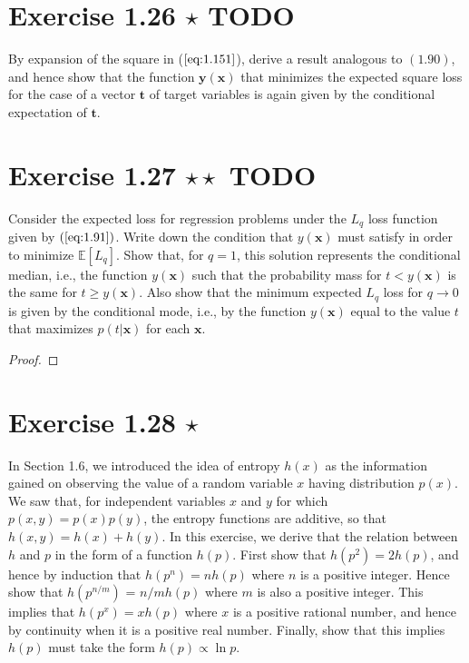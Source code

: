\section*{Exercise 1.26 $\star$ TODO}
By expansion of the square in ($\ref{eq:1.151}$), derive a result analogous to
$(1.90)$, and hence show that the function $\mathbf{y}(\mathbf{x})$ that
minimizes the expected square loss for the case of a vector $\mathbf{t}$ 
of target variables is again given by the conditional expectation of $\mathbf{t}$.

\section*{Exercise 1.27 $\star \star$ TODO}
Consider the expected loss for regression problems under the $L_q$ loss
function given by $(\ref{eq:1.91})$. Write down the condition that $y(\mathbf{x})$ 
must satisfy in order to minimize $\mathbb{E}[L_q]$. Show that, for $q = 1$,
this solution represents the conditional median, i.e., the function 
$y(\mathbf{x})$ such that the probability mass for $t < y(\mathbf{x})$ 
is the same for $t \geq y(\mathbf{x})$. Also show that the minimum expected
$L_q$ loss for $q \to 0$ is given by the conditional mode, i.e., by
the function $y(\mathbf{x})$ equal to the value $t$ that maximizes 
$p(t | \mathbf{x})$ for each  $\mathbf{x}$.

\vspace{1em}

\begin{proof}
    
\end{proof}

\section*{Exercise 1.28 $\star$}
In Section 1.6, we introduced the idea of entropy $h(x)$ as the information
gained on observing the value of a random variable  $x$ having distribution
$p(x)$. We saw that, for independent variables $x$ and $y$ for which
$p(x, y) = p(x)p(y)$, the entropy functions are additive, so that 
$h(x, y) = h(x) + h(y)$. In this exercise, we derive that the relation
between $h$ and  $p$ in the form of a function  $h(p)$. First show that
$h(p^2) = 2h(p)$, and hence by induction that $h(p^n) = nh(p)$ where
$n$ is a positive integer. Hence show that $h(p^{n/m})$ = $n/m h(p)$
where $m$ is also a positive integer. This implies that $h(p^x) = xh(p)$ where
$x$ is a positive rational number, and hence by continuity when it is
a positive real number. Finally, show that this implies $h(p)$ must take
the form  $h(p) \propto \ln p$.

